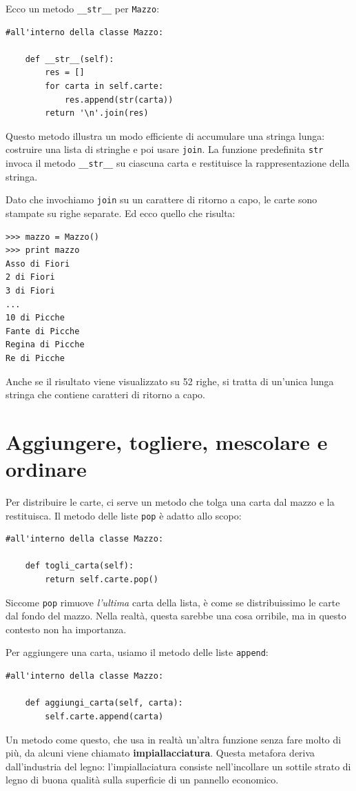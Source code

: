 \documentclass[10pt]{book}
\begin{document}
Ecco un metodo \verb"__str__" per {\tt Mazzo}:

\begin{verbatim}
#all'interno della classe Mazzo:

    def __str__(self):
        res = []
        for carta in self.carte:
            res.append(str(carta))
        return '\n'.join(res)
\end{verbatim}
%
Questo metodo illustra un modo efficiente di accumulare una stringa lunga: costruire una lista di stringhe e poi usare {\tt join}.
La funzione predefinita {\tt str} invoca il metodo \verb"__str__"
su ciascuna carta e restituisce la rappresentazione della stringa.

Dato che invochiamo {\tt join} su un carattere di ritorno a capo, le carte sono stampate su righe separate. Ed ecco quello che risulta:

\begin{verbatim}
>>> mazzo = Mazzo()
>>> print mazzo
Asso di Fiori
2 di Fiori
3 di Fiori
...
10 di Picche
Fante di Picche
Regina di Picche
Re di Picche
\end{verbatim}
%
Anche se il risultato viene visualizzato su 52 righe, si tratta di un'unica lunga stringa che contiene caratteri di ritorno a capo.


\section{Aggiungere, togliere, mescolare e ordinare}

Per distribuire le carte, ci serve un metodo che tolga una carta dal mazzo e la restituisca. Il metodo delle liste {\tt pop} è adatto allo scopo:

\begin{verbatim}
#all'interno della classe Mazzo:

    def togli_carta(self):
        return self.carte.pop()
\end{verbatim}
%
Siccome {\tt pop} rimuove {\em l'ultima} carta della lista, è come se distribuissimo le carte dal fondo del mazzo. Nella realtà, questa sarebbe una cosa orribile, ma in questo contesto non ha importanza.

Per aggiungere una carta, usiamo il metodo delle liste {\tt append}:

\begin{verbatim}
#all'interno della classe Mazzo:

    def aggiungi_carta(self, carta):
        self.carte.append(carta)
\end{verbatim}
%
Un metodo come questo, che usa in realtà un'altra funzione senza fare molto di più, da alcuni viene chiamato {\bf impiallacciatura}.  Questa metafora deriva dall'industria del legno: l'impiallaciatura consiste nell'incollare un sottile strato di legno di buona qualità sulla superficie di un pannello economico.
\end{document}
